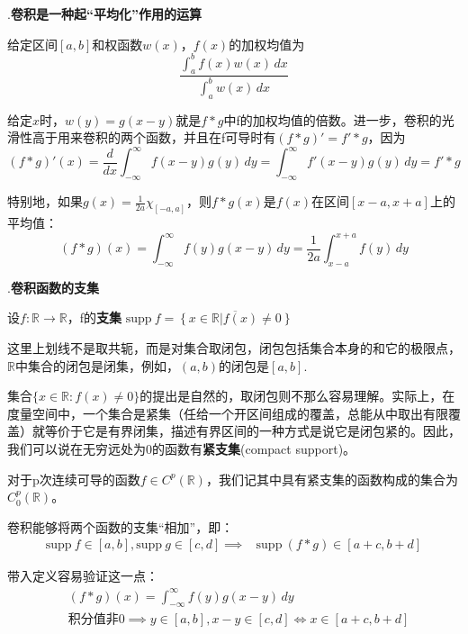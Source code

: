 \documentclass{ctexbook}
\begin{document}
.\textbf{卷积是一种起“平均化”作用的运算}
\begin{definition}[加权均值]
    给定区间$[a,b]$和权函数$w(x)$，$f(x)$的加权均值为\[\frac{\int_{a}^{b}f(x)w(x)\,dx}{\int_{a}^{b}w(x)\,dx}\]
\end{definition}
给定$x$时，$w(y)=g(x-y)$就是$f*g$中f的加权均值的倍数。进一步，卷积的光滑性高于用来卷积的两个函数，并且在f可导时有$(f*g)'=f'*g$，因为
\[(f*g)'(x)=\frac{d}{dx}\int_{-\infty}^{\infty}f(x-y)g(y)\,dy=\int_{-\infty}^{\infty}f'(x-y)g(y)\,dy=f'*g\]

特别地，如果$g(x)=\frac{1}{2a}\chi_{[-a,a]}$，则$f*g(x)$是$f(x)$在区间$[x-a,x+a]$上的平均值：
\[(f*g)(x)=\int_{-\infty}^{\infty}f(y)g(x-y)\,dy=\frac{1}{2a}\int_{x-a}^{x+a}f(y)\,dy\]

.\textbf{卷积函数的支集}

\begin{definition}[支集]
    设$f:\mathbb{R}\to \mathbb{R}$，f的\textbf{支集}
$\text{supp}\ f=\overline{\left\{x\in\mathbb{R}\left|f(x)\neq 0\right.\right\}}$
\end{definition}

这里上划线不是取共轭，而是对集合取闭包，闭包包括集合本身的和它的极限点，$\mathbb{R}$中集合的闭包是闭集，例如，$(a,b)$的闭包是$[a,b]$.

集合$\{x\in\mathbb{R}:f(x)\neq 0\}$的提出是自然的，取闭包则不那么容易理解。实际上，在度量空间中，一个集合是紧集（任给一个开区间组成的覆盖，总能从中取出有限覆盖）就等价于它是有界闭集，描述有界区间的一种方式是说它是闭包紧的。因此，我们可以说在无穷远处为0的函数有\textbf{紧支集}(compact support)。
\begin{definition}[紧支函数空间]
对于p次连续可导的函数$f\in C^p(\mathbb{R})$，我们记其中具有紧支集的函数构成的集合为$C_0^p(\mathbb{R})$。
\end{definition}

\begin{proposition}
    卷积能够将两个函数的支集“相加”，即：\begin{align*}
    \text{supp}\ f\in [a,b],\text{supp}\ g\in [c,d]\implies&\text{supp}\ (f*g)\in [a+c,b+d]
    \end{align*}
\end{proposition}

带入定义容易验证这一点：
\begin{align*}
     & (f*g)(x) =\int_{-\infty}^{\infty}f(y)g(x-y)\,dy                               \\
     & \text{积分值非0}\implies y\in [a,b],x-y\in [c,d]\iff x\in [a+c,b+d]
\end{align*}
\end{document}
